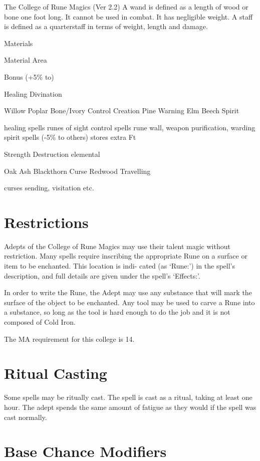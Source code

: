 \begin{Chapter}{The College of Rune Magics (Ver 2.2)}
A wand is defined as a length of wood or bone one 
foot long. It cannot be used in combat. It has negligible weight.  A staff is defined as a quarterstaff in 
terms of weight, length and damage. 

Materials 

Material  Area 

Bonus (+5\% to) 

Healing 
Divination 

Willow 
Poplar 
Bone/Ivory  Control 
Creation 
Pine 
Warning 
Elm 
Beech 
Spirit 

healing spells  
runes of sight  
control spells 
rune wall, weapon 
purification, warding 
spirit spells (-5\% to 
others)  
stores extra Ft 

Strength 
Destruction  elemental 

Oak 
Ash 
Blackthorn  Curse 
Redwood  Travelling 

curses 
sending, visitation etc. 


\section{Restrictions}

Adepts of the College of Rune Magics may use their talent magic
without restriction.  Many spells require inscribing the appropriate
Rune on a surface or item to be enchanted. This location is indi-
cated (as ‘Rune:’) in the spell’s description, and full details are
given under the spell’s ‘Effects:’.

In order to write the Rune, the Adept may use any substance that will
mark the surface of the object to be enchanted.  Any tool may be used
to carve a Rune into a substance, so long as the tool is hard enough
to do the job and it is not composed of Cold Iron.

The MA requirement for this college is 14. 


\section{Ritual Casting}

Some spells may be ritually cast.  The spell is cast as a ritual,
taking at least one hour.  The adept spends the same amount of fatigue
as they would if the spell was cast normally.


\section{Base Chance Modifiers}


\end{Chapter}
